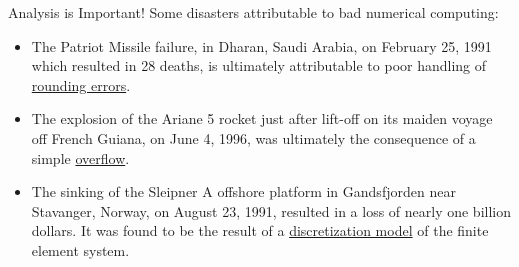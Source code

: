 \documentclass[10pt]{beamer}
\begin{document}
\begin{frame}{Analysis is Important!}
Some disasters attributable to bad numerical computing:\\[6mm]

\begin{itemize}
\item The Patriot Missile failure, in Dharan, Saudi Arabia, on February 25, 1991 which resulted in 28 deaths, is ultimately attributable to poor handling of \underline{rounding errors}.\\[3mm]

\item The explosion of the Ariane 5 rocket just after lift-off on its maiden voyage off French Guiana, on June 4, 1996, was ultimately the consequence of a simple \underline{overflow}.\\[3mm]

\item The sinking of the Sleipner A offshore platform in Gandsfjorden near Stavanger, Norway, on August 23, 1991, resulted in a loss of nearly one billion dollars. It was found to be the result of a \underline{discretization model} of the finite element system.\\[3mm]

\end{itemize}

\end{frame}



      
\end{document}
